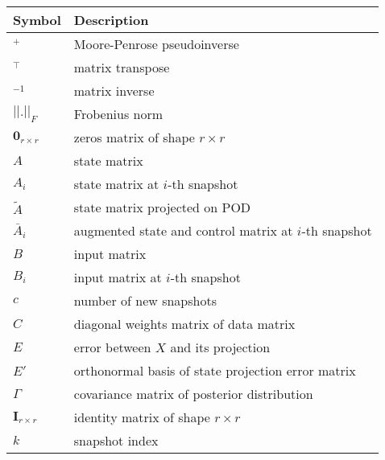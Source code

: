 \begin{longtable}{p{2cm}l}
	\toprule
	\textbf{Symbol}                & \textbf{Description}                                    \\
	\midrule
	\endhead{}
	\(^+\)                         & Moore-Penrose pseudoinverse                             \\
	\(^\top \)                     & matrix transpose                                        \\
	\(^{-1}\)                      & matrix inverse                                          \\
	\(|| . ||_F\)                  & Frobenius norm                                          \\
	\(\mathbf{0}_{r \times r}\)    & zeros matrix of shape \(r \times r\)                    \\
	\(A\)                          & state matrix                                            \\
	\(A_i\)                        & state matrix at \(i\)-th snapshot                       \\
	\(\tilde{A}\)                  & state matrix projected on POD                           \\
	\(\bar{A}_i\)                  & augmented state and control matrix at \(i\)-th snapshot \\
	\(B\)                          & input matrix                                            \\
	\(B_i\)                        & input matrix at \(i\)-th snapshot                       \\
	\(c\)                          & number of new snapshots                                 \\
	\(C\)                          & diagonal weights matrix of data matrix                  \\
	\(E\)                          & error between \(X\) and its projection                  \\
	\(E'\)                         & orthonormal basis of state projection error matrix      \\
	\(\Gamma \)                    & covariance matrix of posterior distribution             \\
	\(\textbf{I}_{r \times r}\)    & identity matrix of shape \(r \times r\)                 \\
	\(k\)                          & snapshot index                                          \\

\end{longtable}
